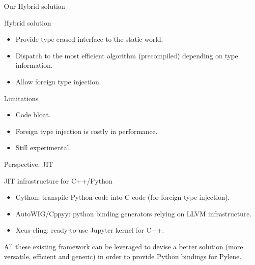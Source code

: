 \documentclass[12pt,aspectratio=169]{beamer}
\begin{document}
\begin{frame}{Our Hybrid solution}
  \begin{alertblock}{Hybrid solution}
    \begin{itemize}
      \item Provide type-erased interface to the static-world.
      \item Dispatch to the most efficient algorithm (precompiled) depending on type information.
      \item Allow foreign type injection.
    \end{itemize}
  \end{alertblock}
  \begin{alertblock}{Limitations}
    \begin{itemize}
      \item Code bloat.
      \item Foreign type injection is costly in performance.
      \item Still experimental.
    \end{itemize}
  \end{alertblock}
\end{frame}

\begin{frame}{Perspective: JIT}
  \begin{alertblock}{JIT infrastructure for C++/Python}
    \begin{itemize}
      \item Cython: transpile Python code into C code (for foreign type injection).
      \item AutoWIG/Cppyy: python binding generators relying on LLVM infrastructure.
      \item Xeus-cling: ready-to-use Jupyter kernel for C++.
    \end{itemize}
  \end{alertblock}
  All these existing framework can be leveraged to devise a better solution (more versatile, efficient and generic) in
  order to provide Python bindings for Pylene.
\end{frame}
\end{document}
